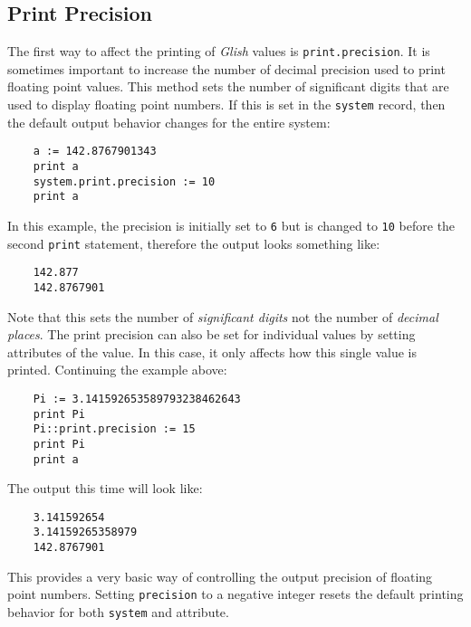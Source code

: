 \subsection{Print Precision}
\label{system-print-precision}
The first way to affect the printing of {\em Glish} values 
is \verb+print.precision+. It is sometimes important to increase
the number of decimal precision used to print floating point
values. This method  sets
the number of significant digits that are used to 
display floating point numbers.
If this is set in the {\tt system} record, then the default output
behavior changes for the entire system:
\begin{verbatim}
    a := 142.8767901343
    print a
    system.print.precision := 10
    print a
\end{verbatim}
In this example, the precision is initially set to {\tt 6} but is changed to {\tt 10}
before the second {\tt print} statement, therefore the output looks
something like:
\begin{verbatim}
    142.877
    142.8767901
\end{verbatim}
Note that this sets the number of {\em significant digits} not the number
of {\em decimal places}. The print precision can also be set for individual
values by setting attributes of the value. In this case, it only affects how
this single value is printed. Continuing the example above:
\begin{verbatim}
    Pi := 3.141592653589793238462643
    print Pi
    Pi::print.precision := 15
    print Pi
    print a
\end{verbatim}
The output this time will look like:
\begin{verbatim}
    3.141592654
    3.14159265358979
    142.8767901
\end{verbatim}
This provides a very basic way of controlling the output precision of
floating point numbers. Setting {\tt precision} to a negative integer
resets the default printing behavior for both {\tt system} and attribute.

